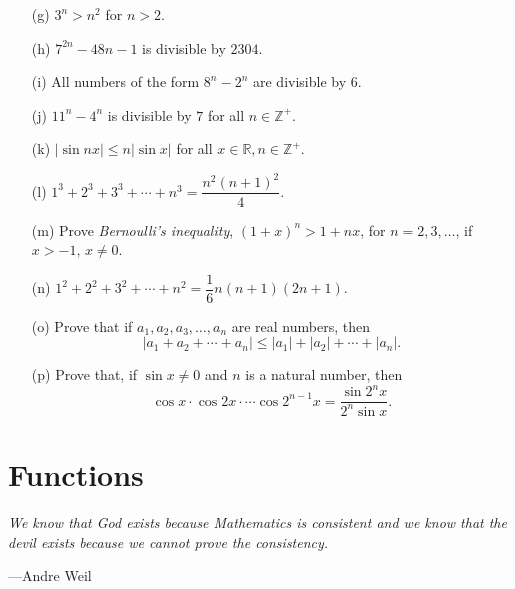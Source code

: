 \documentclass[titlepage,a4paper,12pt]{report}
\begin{document}
\begin{enumerate}
\begin{itemize}
\item[(g)] $3^n>n^2$ for $n>2$.
\item[(h)] $7^{2n}-48n-1$ is divisible by $2304$.
\item[(i)] All numbers of the form $8^n-2^n$ are divisible by $6$.
\item[(j)] $11^n-4^n$ is divisible by $7$ for all $n \in \mathbb{Z ^+}$.
\item[(k)] $|\sin nx| \leq n|\sin x|$ for all $x \in \mathbb{R}, n \in \mathbb{Z ^+}$.
\item[(l)] $1^3+2^3+3^3+\cdots +n^3=\dfrac{n^2(n+1)^2}{4}$.
\item[(m)] Prove \textit{Bernoulli's inequality}, $(1+x)^n>1+nx$, for $n=2,3,\dots$, if $x>-1, \, x\neq 0$.
\item[(n)] $1^2+2^2+3^2+\cdots +n^2=\dfrac{1}{6}n(n+1)(2n+1)$.
\item[(o)] Prove that if $a_1, a_2, a_3, \dots , a_n$ are real numbers, then 
\begin{equation*}
|a_1+a_2+\cdots +a_n|\leq |a_1| +|a_2|+\cdots +|a_n|.
\end{equation*}
\item[(p)] Prove that, if $\sin x \neq 0$ and $n$ is a natural number, then 
\begin{equation*}
\cos x \cdot \cos 2x \cdot \cdots \cos 2^{n-1} x =\dfrac{\sin 2^n x}{2^n\sin x}.
\end{equation*} 
\end{itemize}
\end{enumerate}
\chapter{Functions}
\begin{center}
	\small{\parbox{18cm}{
		\begin{raggedright}
		{\small
		\textit{We know that God exists because Mathematics is consistent and we know that the devil exists because we cannot prove the consistency.}
 }
 
				\vspace{.5cm}\hfill{---Andre Weil}
		\end{raggedright}
	}
} 
\end{center}
\end{document}
